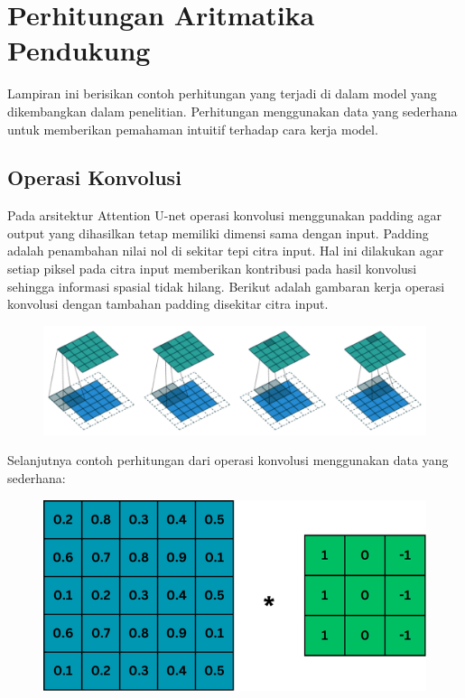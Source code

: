 \chapter{Perhitungan Aritmatika Pendukung}

\noindent Lampiran ini berisikan contoh perhitungan yang terjadi di dalam model yang dikembangkan dalam penelitian. Perhitungan menggunakan data yang sederhana untuk memberikan pemahaman intuitif terhadap cara kerja model. 

\section{Operasi Konvolusi}
\noindent Pada arsitektur Attention U-net operasi konvolusi menggunakan padding agar output yang dihasilkan tetap memiliki dimensi sama dengan input. Padding adalah penambahan nilai nol di sekitar tepi citra input. Hal ini dilakukan agar setiap piksel pada citra input memberikan kontribusi pada hasil konvolusi sehingga informasi spasial tidak hilang. Berikut adalah gambaran kerja operasi konvolusi dengan tambahan padding disekitar citra input.

\begin{figure}[H]
	\centering
	\includegraphics[scale=.4]{gambar/lampiran/stride.png}
\end{figure}

\noindent Selanjutnya contoh perhitungan dari operasi konvolusi menggunakan data yang sederhana:

\begin{figure}[H]
	\centering
	\includegraphics[scale=.4]{gambar/lampiran/konvolusi.png}
\end{figure}

